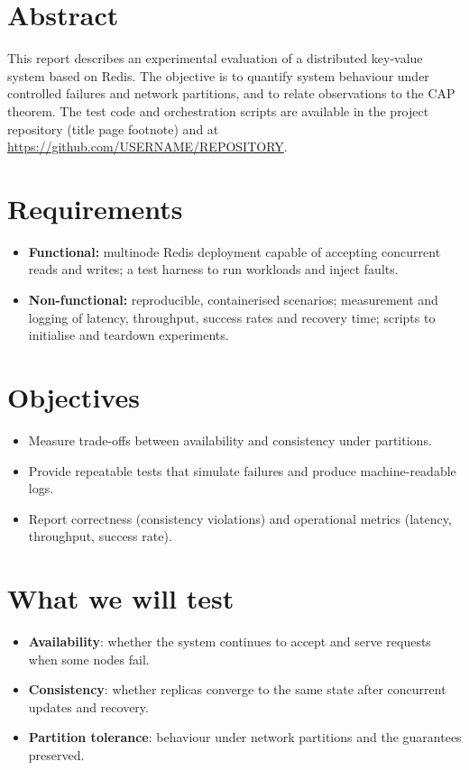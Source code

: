 \documentclass{article}
\begin{document}


\section*{Abstract}
This report describes an experimental evaluation of a distributed key-value system based on Redis. The objective is to quantify system behaviour under controlled failures and network partitions, and to relate observations to the CAP theorem. The test code and orchestration scripts are available in the project repository (title page footnote) and at \url{https://github.com/USERNAME/REPOSITORY}.


\tableofcontents
{}
\newpage

\section{Requirements}
\begin{itemize}
    \item \textbf{Functional:} multinode Redis deployment capable of accepting concurrent reads and writes; a test harness to run workloads and inject faults.
    \item \textbf{Non-functional:} reproducible, containerised scenarios; measurement and logging of latency, throughput, success rates and recovery time; scripts to initialise and teardown experiments.
\end{itemize}

\section{Objectives}
\begin{itemize}
    \item Measure trade-offs between availability and consistency under partitions.
    \item Provide repeatable tests that simulate failures and produce machine-readable logs.
    \item Report correctness (consistency violations) and operational metrics (latency, throughput, success rate).
\end{itemize}

\section{What we will test}
\begin{itemize}
    \item \textbf{Availability}: whether the system continues to accept and serve requests when some nodes fail.
    \item \textbf{Consistency}: whether replicas converge to the same state after concurrent updates and recovery.
    \item \textbf{Partition tolerance}: behaviour under network partitions and the guarantees preserved.
\end{itemize}
\end{document}
